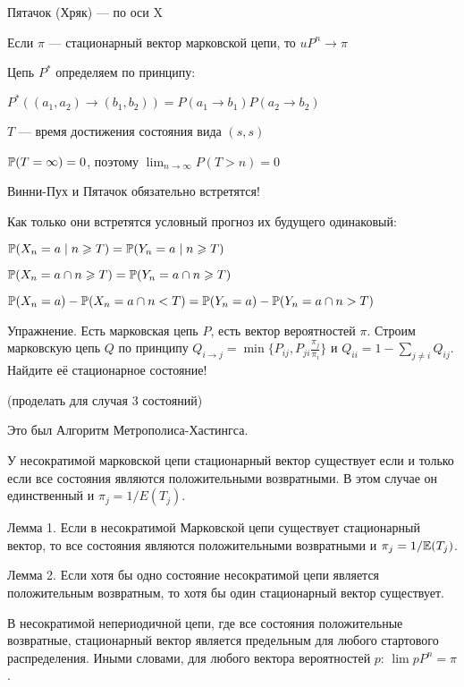 Пятачок (Хряк) --- по оси X

Если $\pi$ --- стационарный вектор марковской цепи, то $uP^n\to \pi$


Цепь $P^*$ определяем по принципу:

$P^*\left((a_1,a_2)\to (b_1,b_2)\right)=P(a_1\to b_1)P(a_2\to b_2)$

$T$ --- время достижения состояния вида $(s,s)$


$\P(T=\infty)=0$, поэтому $\lim_{n\to\infty} P(T>n)=0$

Винни-Пух и Пятачок обязательно встретятся!

Как только они встретятся условный прогноз их  будущего одинаковый:

$\P(X_n=a\mid n\geq T)=\P(Y_n=a\mid n\geq T)$

$\P(X_n=a \cap n\geq T)=\P(Y_n=a \cap n\geq T)$


$\P(X_n=a)-\P(X_n=a \cap n<T)=\P(Y_n=a)-\P(Y_n=a \cap n> T)$




Упражнение. Есть марковская цепь $P$, есть вектор вероятностей $\pi$. Строим марковскую цепь $Q$ по принципу $Q_{i\to j}=\min \{ P_{ij}, P_{ji}\frac{\pi_j}{\pi_i} \}$ и $Q_{ii}=1-\sum_{j\neq i} Q_{ij}$. Найдите её стационарное состояние!


(проделать для случая 3 состояний)

Это был Алгоритм Метрополиса-Хастингса.




\begin{theorem}
У несократимой марковской цепи стационарный вектор существует если и только если все состояния являются положительными возвратными. В этом случае он единственный и $\pi_j=1/E(T_j)$.
\end{theorem}



Лемма 1. Если в несократимой Марковской цепи существует стационарный вектор, то все состояния являются положительными возвратными и $\pi_j=1/\E(T_j)$.


Лемма 2. Если хотя бы одно состояние несократимой цепи является положительным возвратным, то хотя бы один стационарный вектор существует.


\begin{theorem}
В несократимой непериодичной цепи, где все состояния положительные возвратные, стационарный вектор является предельным для любого стартового распределения. Иными словами, для любого вектора вероятностей $p$: $\lim p P^{n}=\pi$.
\end{theorem}

